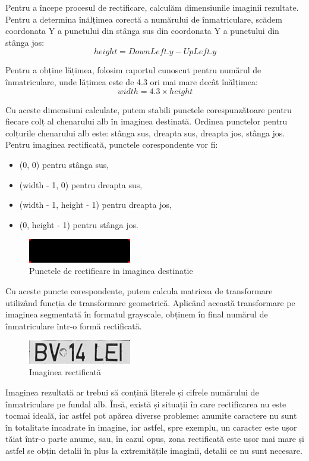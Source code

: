 \documentclass[a4paper,12pt]{report}
\begin{document}
Pentru a începe procesul de rectificare, calculăm dimensiunile imaginii rezultate. Pentru a determina înălțimea corectă a numărului de înmatriculare, scădem coordonata Y a punctului din stânga sus din coordonata Y a punctului din stânga jos:
\[
    height = DownLeft.y - UpLeft.y
\]

Pentru a obține lățimea, folosim raportul cunoscut pentru numărul de înmatriculare, unde lățimea este de 4.3 ori mai mare decât înălțimea:
\[
    width = 4.3 \times height
\]

Cu aceste dimensiuni calculate, putem stabili punctele corespunzătoare pentru fiecare colț al chenarului alb în imaginea destinată. Ordinea punctelor pentru colțurile chenarului alb este: stânga sus, dreapta sus, dreapta jos, stânga jos. Pentru imaginea rectificată, punctele corespondente vor fi:
\begin{itemize}
    \item (0, 0) pentru stânga sus,
    \item (width - 1, 0) pentru dreapta sus,
    \item (width - 1, height - 1) pentru dreapta jos,
    \item (0, height - 1) pentru stânga jos.
\end{itemize}

\begin{figure}[h!]
    \centering
    \includegraphics[width=0.4\textwidth]{images/points_on_black.jpg}
    \caption{Punctele de rectificare in imaginea destinație}
\end{figure}
\FloatBarrier

Cu aceste puncte corespondente, putem calcula matricea de transformare utilizând funcția de transformare geometrică. Aplicând această transformare pe imaginea segmentată în formatul grayscale, obținem în final numărul de înmatriculare într-o formă rectificată.

\begin{figure}[h!]
    \centering
    \includegraphics[width=0.4\textwidth]{images/transformed.jpg}
    \caption{Imaginea rectificată}
\end{figure}
\FloatBarrier

Imaginea rezultată ar trebui să conțină literele și cifrele numărului de înmatriculare pe fundal alb. Însă, există și situații în care rectificarea nu este tocmai ideală, iar astfel pot apărea diverse probleme: anumite caractere nu sunt în totalitate incadrate în imagine, iar astfel, spre exemplu, un caracter este ușor tăiat într-o parte anume, sau, în cazul opus, zona rectificată este ușor mai mare și astfel se obțin detalii în plus la extremitățile imaginii, detalii ce nu sunt necesare.
\end{document}
